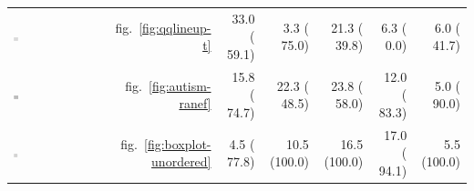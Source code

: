 \documentclass[12pt]{article} %
\newcommand{\hh}[1]{{\color{orange} #1}}
\begin{document}
\begin{table}[ht]
\begin{tabular}{Mrrrrrr}
\includegraphics[width=0.05\textwidth]{radontranef-icon}&    fig.~\ref{fig:qqlineup-t} & 33.0 ( 59.1) & 3.3 ( 75.0) & 21.3 ( 39.8) & 6.3 (  0.0) & 6.0 ( 41.7) \\ 
\includegraphics[width=0.05\textwidth]{autism2-fanned-icon}& fig.~\ref{fig:autism-ranef} & 15.8 ( 74.7) & 22.3 ( 48.5) & 23.8 ( 58.0) & 12.0 ( 83.3) & 5.0 ( 90.0) \\ 
\includegraphics[width=0.05\textwidth]{autism-unordered-icon}&   fig.~\ref{fig:boxplot-unordered}  & 4.5 ( 77.8) & 10.5 (100.0) & 16.5 (100.0) & 17.0 ( 94.1) & 5.5 (100.0) \\ 
   \hline
\end{tabular}
\end{table}


%
\end{document}
